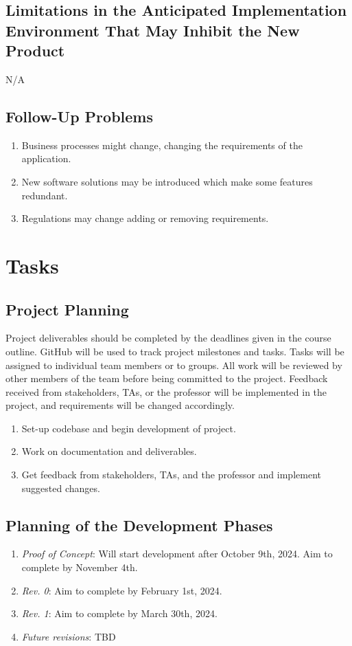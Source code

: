 \documentclass[12pt]{article}
\begin{document}
\subsection{Limitations in the Anticipated Implementation Environment That May
Inhibit the New Product}
N/A
\subsection{Follow-Up Problems}
\begin{enumerate}
  \item Business processes might change, changing the requirements of
    the application.
  \item New software solutions may be introduced which make some
    features redundant.
  \item Regulations may change adding or removing requirements.
\end{enumerate}

\section{Tasks}
\subsection{Project Planning}
Project deliverables should be completed by the deadlines given in
the course outline. GitHub will be used to track project milestones
and tasks. Tasks will be assigned to individual team members or to
groups. All work will be reviewed by other members of the team before
being committed to the project. Feedback received from stakeholders,
TAs, or the professor will be implemented in the project, and
requirements will be changed accordingly.
\begin{enumerate} [{Task }1.]
  \item Set-up codebase and begin development of project.
  \item Work on documentation and deliverables.
  \item Get feedback from stakeholders, TAs, and the professor and implement
    suggested changes.
\end{enumerate}

\subsection{Planning of the Development Phases}
\begin{enumerate}
  \item \textit{Proof of Concept}: Will start development after
    October 9th, 2024. Aim to complete by November 4th.
  \item \textit{Rev. 0}: Aim to complete by February 1st, 2024.
  \item \textit{Rev. 1}: Aim to complete by March 30th, 2024.
  \item \textit{Future revisions}: TBD
\end{enumerate}
\end{document}

